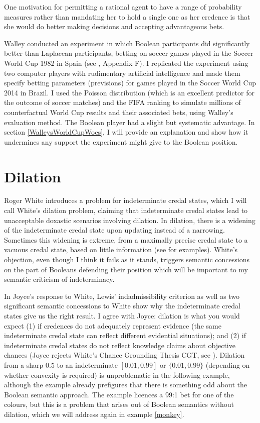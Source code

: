 One motivation for permitting a rational agent to have
a range of probability measures rather than mandating
her to hold a single one as her credence is that she
would do better making decisions and accepting
advantageous bets.

Walley conducted an experiment in which Boolean
participants did significantly better than Laplacean
participants, betting on soccer games played in the
Soccer World Cup 1982 in Spain (see
, Appendix F). I replicated the experiment using two
computer players with rudimentary artificial
intelligence and made them specify betting parameters
(previsions) for games played in the Soccer World Cup
2014 in Brazil. I used the Poisson distribution (which
is an excellent predictor for the outcome of soccer
matches) and the FIFA ranking to simulate millions of
counterfactual World Cup results and their associated
bets, using Walley's evaluation method. The Boolean
player had a slight but systematic advantage. In
section \ref{WalleysWorldCupWoes}, I will provide an
explanation and show how it undermines any support the
experiment might give to the Boolean position.

\section{Dilation}
\label{Dilation}

Roger White introduces a problem for indeterminate
credal states, which I will call White's dilation
problem, claiming that indeterminate credal states lead
to unacceptable doxastic scenarios involving dilation.
In dilation, there is a widening of the indeterminate
credal state upon updating instead of a narrowing.
Sometimes this widening is extreme, from a maximally
precise credal state to a vacuous credal state, based
on little information (see  for
examples). White's objection, even though I think it
fails as it stands, triggers semantic concessions on
the part of Booleans defending their position which
will be important to my semantic criticism of
indeterminacy.

In Joyce's response to White, Lewis' indadmissibility
criterion as well as two significant semantic
concessions to White show why the indeterminate credal
states give us the right result. I agree with Joyce:
dilation is what you would expect (1) if credences do
not adequately represent evidence (the same
indeterminate credal state can reflect different
evidential situations); and (2) if indeterminate credal
states do not reflect knowledge claims about objective
chances (Joyce rejects White's Chance Grounding Thesis
CGT, see ). Dilation from a
sharp $0.5$ to an indeterminate $[0.01,0.99]$ or
$\{0.01,0.99\}$ (depending on whether convexity is
required) is unproblematic in the following example,
although the example already prefigures that there is
something odd about the Boolean semantic approach. The
example licences a 99:1 bet for one of the colours, but
this is a problem that arises out of Boolean semantics
without dilation, which we will address again in
example \ref{monkey}.

